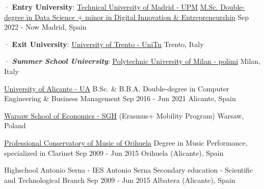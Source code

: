 

\begin{cventries}

  \cventry
    {· \textbf{Entry University}: \href{https://www.upm.es/}{Technical University of Madrid - UPM}} %
    {\href{https://masterschool.eitdigital.eu/data-science}{M.Sc. Double-degree in Data Science + minor in Digital Innovation \& Entrepreneurship}} %
    {Sep 2022 - Now} %
    {Madrid, Spain} %
    {}
    
  \cventrynew
	{· \textbf{Exit University}: \href{https://www.unitn.it/en}{University of Trento - UniTn}} %
	{} %
	{} %
	{Trento, Italy} %
	{}

  \cventrynewnew
	{· \textit{\textbf{Summer School University}}: \href{https://www.polimi.it/}{Polytechnic University of Milan - polimi}} %
	{} %
	{} %
	{Milan, Italy} %
	{}
	
  \cventrymod
	{\href{https://www.ua.es/}{University of Alicante - UA}} %
	{B.Sc. \&  B.B.A. Double-degree in Computer Engineering \& Business Management} %
	{Sep 2016 - Jun 2021} %
	{Alicante, Spain} %
	{}
	
  \cventrynew
	{\href{https://www.sgh.waw.pl/en}{Warsaw School of Economics - SGH}  (Erasmus+ Mobility Program)} %
	{} %
	{} %
	{Warsaw, Poland} %
	{}
	
  \cventrymod
	{\href{https://conservatorioorihuela.com/}{Professional Conservatory of Music of Orihuela}} %
	{Degree in Music Performance, specialized in Clarinet} %
	{Sep 2009 - Jun 2015} %
	{Orihuela (Alicante), Spain} %
	{}
		
  \cventry
	{Highschool Antonio Serna - IES Antonio Serna} %
	{Secondary education - Scientific and Technological Branch} %
	{Sep 2009 - Jun 2015} %
	{Albatera (Alicante), Spain} %
	{}
\end{cventries}
